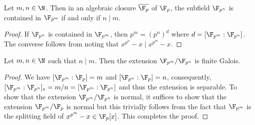 \begin{theorem}
    Let $m,n\in\N$. Then in an algebraic closure $\overline{\F_p}$ of $\F_p$, the subfield $\F_{p^n}$ is contained in $\F_{p^m}$ if and only if $n\mid m$.
\end{theorem}
\begin{proof}
    If $\F_{p^n}$ is contained in $\F_{p^m}$, then $p^m = (p^n)^d$ where $d = [\F_{p^m}:\F_{p^n}]$. The converse follows from noting that $x^{p^n} - x\mid x^{p^m} - x$.
\end{proof}

\begin{theorem}
    Let $m,n\in\N$ such that $n\mid m$. Then the extension $\F_{p^m}/\F_{p^n}$ is finite Galois.
\end{theorem}
\begin{proof}
    We have $[\F_{p^m}:\F_p] = m$ and $[\F_{p^n}:\F_p] = n$, consequently, $[\F_{p^m}:\F_{p^n}]_s = m/n = [\F_{p^m}:\F_{p^n}]$ and thus the extension is separable. To show that the extension $\F_{p^m}/\F_{p^n}$ is normal, it suffices to show that the extension $\F_{p^m}/\F_p$ is normal but this trivially follows from the fact that $\F_{p^m}$ is the splitting field of $x^{p^m} - x\in\F_p[x]$. This completes the proof.
\end{proof}